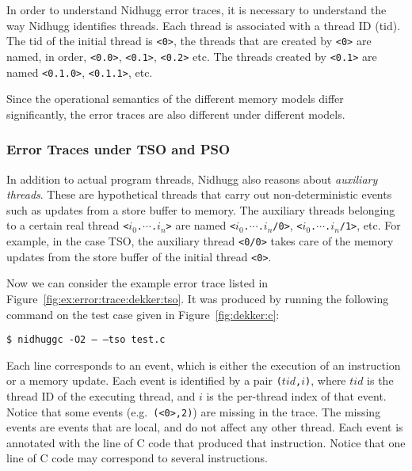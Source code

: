 \documentclass[a4paper]{article}
\begin{document}
In order to understand Nidhugg error traces, it is necessary to
understand the way Nidhugg identifies threads. Each thread is
associated with a thread ID (tid). The tid of the initial thread is
\texttt{<0>}, the threads that are created by \texttt{<0>} are named,
in order, \texttt{<0.0>}, \texttt{<0.1>}, \texttt{<0.2>} etc. The
threads created by \texttt{<0.1>} are named \texttt{<0.1.0>},
\texttt{<0.1.1>}, etc.

Since the operational semantics of the different memory models differ
significantly, the error traces are also different under different
models.

\subsubsection{Error Traces under TSO and PSO}

In addition to actual program threads, Nidhugg also reasons about
\emph{auxiliary threads}. These are hypothetical threads that carry
out non-deterministic events such as updates from a store buffer to
memory. The auxiliary threads belonging to a certain real thread
\texttt{<$i_0$.$\cdots$.$i_n$>} are named
\texttt{<$i_0$.$\cdots$.$i_n$/0>}, \texttt{<$i_0$.$\cdots$.$i_n$/1>},
etc. For example, in the case TSO, the auxiliary thread \texttt{<0/0>}
takes care of the memory updates from the store buffer of the initial
thread \texttt{<0>}.

Now we can consider the example error trace listed in
Figure~\ref{fig:ex:error:trace:dekker:tso}. It was produced by running the
following command on the test case given in Figure~\ref{fig:dekker:c}:

\vspace{5pt}
\noindent
\texttt{\$ nidhuggc -O2 -- --tso test.c}

\vspace{5pt}\noindent
%
Each line corresponds to an event, which is either the execution of an
instruction or a memory update. Each event is identified by a pair
\texttt{($tid$,$i$)}, where $tid$ is the thread ID of the executing
thread, and $i$ is the per-thread index of that event. Notice that
some events (e.g.\ \texttt{(<0>,2)}) are missing in the trace. The
missing events are events that are local, and do not affect any other
thread. Each event is annotated with the line of C code that produced
that instruction. Notice that one line of C code may correspond to
several instructions.
\end{document}
